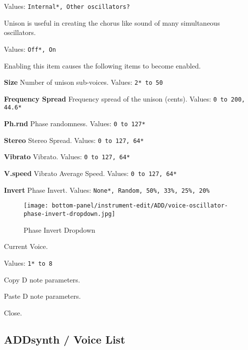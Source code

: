    Values: \texttt{Internal*, Other oscillators?}

   Unison is useful in creating the chorus like sound of many simultaneous
   oscillators.

   Values: \texttt{Off*, On}

   Enabling this item causes the following items to become enabled.

      \begin{enumber}
         \item \textbf{Size}
         Number of unison sub-voices.
         Values: \texttt{2* to 50}
         \item \textbf{Frequency Spread}
         Frequency spread of the unison (cents).
         Values: \texttt{0 to 200, 44.6*}
         \item \textbf{Ph.rnd}
         Phase randomness.
         Values: \texttt{0 to 127*}
         \item \textbf{Stereo}
         Stereo Spread.
         Values: \texttt{0 to 127, 64*}
         \item \textbf{Vibrato}
         Vibrato.
         Values: \texttt{0 to 127, 64*}
         \item \textbf{V.speed}
         Vibrato Average Speed.
         Values: \texttt{0 to 127, 64*}
         \item \textbf{Invert}
         Phase Invert.
         Values: \texttt{None*, Random, 50\%, 33\%, 25\%, 20\%}
      \end{enumber}

\begin{figure}[H]
   \centering 
   \texttt{[image: bottom-panel/instrument-edit/ADD/voice-oscillator-phase-invert-dropdown.jpg]}
   \caption{Phase Invert Dropdown}
   \label{fig:phase_invert_dropdown}
\end{figure}

   Current Voice.

   Values: \texttt{1* to 8}

   Copy D note parameters.

   Paste D note parameters.

   Close.


\subsection{ADDsynth / Voice List}
\label{subsec:addsynth_voice_list}

